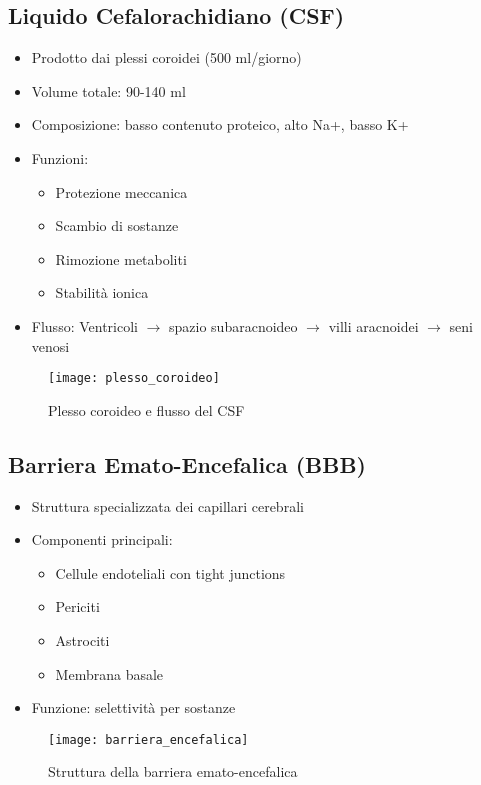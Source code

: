 \documentclass[11pt]{article}
\begin{document}
\subsection*{Liquido Cefalorachidiano (CSF)}
\begin{itemize}
    \item Prodotto dai plessi coroidei (500 ml/giorno)
    \item Volume totale: 90-140 ml
    \item Composizione: basso contenuto proteico, alto Na+, basso K+
    \item Funzioni:
    \begin{itemize}
        \item Protezione meccanica
        \item Scambio di sostanze
        \item Rimozione metaboliti
        \item Stabilità ionica
    \end{itemize}
    \item Flusso: Ventricoli $\rightarrow$ spazio subaracnoideo $\rightarrow$ villi aracnoidei $\rightarrow$ seni venosi
\end{itemize}
\begin{figure}[h]
    \centering
    \texttt{[image: plesso\_coroideo]} %
    \caption{Plesso coroideo e flusso del CSF}
    \label{fig:csf}
\end{figure}

\subsection*{Barriera Emato-Encefalica (BBB)}
\begin{itemize}
    \item Struttura specializzata dei capillari cerebrali
    \item Componenti principali:
    \begin{itemize}
        \item Cellule endoteliali con tight junctions
        \item Periciti
        \item Astrociti
        \item Membrana basale
    \end{itemize}
    \item Funzione: selettività per sostanze
\end{itemize}
\begin{figure}[h]
    \centering
    \texttt{[image: barriera\_encefalica]} %
    \caption{Struttura della barriera emato-encefalica}
    \label{fig:bbb}
\end{figure}
\end{document}
